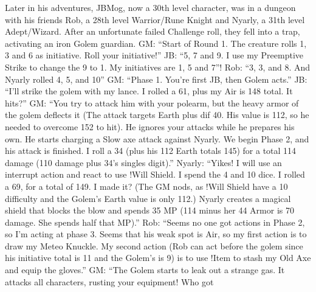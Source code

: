 \begin{multimog}
Later in his adventures, JBMog, now a 30th level character,
was in a dungeon with his friends Rob, a 28th level
Warrior/Rune Knight and Nyarly, a 31th level
Adept/Wizard. After an unfortunate failed Challenge roll,
they fell into a trap, activating an iron Golem guardian.
GM: “Start of Round 1. The creature rolls 1, 3 and
6 as initiative. Roll your initiative!”
JB: “5, 7 and 9. I use my Preemptive Strike to
change the 9 to 1. My initiatives are 1, 5 and 7”!
Rob: “3, 3, and 8. And Nyarly rolled 4, 5, and 10”
GM: “Phase 1. You're first JB, then Golem acts.”
JB: “I'll strike the golem with my lance. I rolled a
61, plus my Air is 148 total. It hits?”
GM: “You try to attack him with your polearm,
but the heavy armor of the golem deflects it (The attack
targets Earth plus dif 40. His value is 112, so he needed
to overcome 152 to hit). He ignores your attacks while he
prepares his own. He starts charging a Slow axe attack
against Nyarly. We begin Phase 2, and his attack is
finished. I roll a 34 (plus his 112 Earth totals 145) for a
total 114 damage (110 damage plus 34's singles digit).”
Nyarly: “Yikes! I will use an interrupt action and
react to use !Will Shield. I spend the 4 and 10 dice. I
rolled a 69, for a total of 149. I made it? (The GM nods,
as !Will Shield have a 10 difficulty and the Golem's Earth
value is only 112.) Nyarly creates a magical shield that
blocks the blow and spends 35 MP (114 minus her 44
Armor is 70 damage. She spends half that MP).”
Rob: “Seems no one got actions in Phase 2, so I'm
acting at phase 3. Seems that his weak spot is Air, so my
first action is to draw my Meteo Knuckle. My second
action (Rob can act before the golem since his initiative
total is 11 and the Golem's is 9) is to use !Item to stash
my Old Axe and equip the gloves.”
GM: “The Golem starts to leak out a strange gas.
It attacks all characters, rusting your equipment! Who got


\end{multimog}
